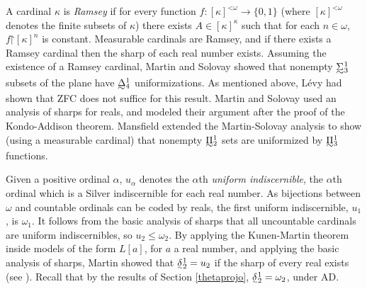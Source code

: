 \documentclass{book}%
\def\underTilde#1{{\baselineskip=0pt\vtop{\hbox{$#1$}\hbox{$\sim$}}}{}}
\def\undertilde#1{{\baselineskip=0pt\vtop
  {\hbox{$#1$}\hbox{$\scriptscriptstyle\sim$}}}{}}
\newcommand{\uTPi}{\underTilde{\Pi}}
\newcommand{\uTSigma}{\underTilde{\Sigma}}
\newcommand{\uTDelta}{\underTilde{\Delta}}
\newcommand{\utdelta}{\undertilde{\delta}}
\newcommand{\restrict}{\mathord{\upharpoonright}}
\newcommand{\less}{\mathord{<}}
\begin{document}
A cardinal $\kappa$ is \emph{Ramsey} if for every function $f\colon [\kappa]^{\less\omega} \to
\{0,1\}$ (where $[\kappa]^{\less\omega}$
denotes the finite subsets of $\kappa$) there exists $A \in [\kappa]^{\kappa}$
such that for each $n \in \omega$, $f \restrict [\kappa]^{n}$ is
constant. Measurable cardinals are Ramsey, and if there exists a
Ramsey cardinal then the sharp of each real number exists. Assuming the existence of a Ramsey cardinal, Martin and
Solovay  showed that nonempty
$\uTSigma^{1}_{3}$ subsets of the plane have $\uTDelta^{1}_{4}$
uniformizations.
As mentioned above, L\'{e}vy  had shown that ZFC does not suffice for this result. Martin and Solovay used an analysis of sharps for reals,
and modeled their argument after the proof of the Kondo-Addison theorem.
Mansfield
 extended the Martin-Solovay analysis to show (using a measurable cardinal) that nonempty $\uTPi^{1}_{2}$ sets are uniformized by $\uTPi^{1}_{3}$ functions.


Given a positive ordinal $\alpha$,
$u_{\alpha}$ denotes the $\alpha$th \emph{uniform indiscernible},
the $\alpha$th ordinal which is a Silver indiscernible for each real number. As bijections between $\omega$ and countable
ordinals can be coded by reals, the first uniform indiscernible,
$u_{1}$, is $\omega_{1}$. It follows from the basic analysis of sharps that all uncountable cardinals are uniform indiscernibles, so
$u_{2} \leq \omega_{2}$.
By applying the Kunen-Martin theorem inside models of the form $L[a]$, for $a$ a real number, and applying the basic analysis of sharps, Martin showed that $\utdelta^{1}_{2} = u_{2}$ if the sharp of every real exists (see \cite{Kechris:1978}).  Recall that by the results of Section \ref{thetaprojo}, $\utdelta^{1}_{2} = \omega_{2}$, under AD.
\end{document}
